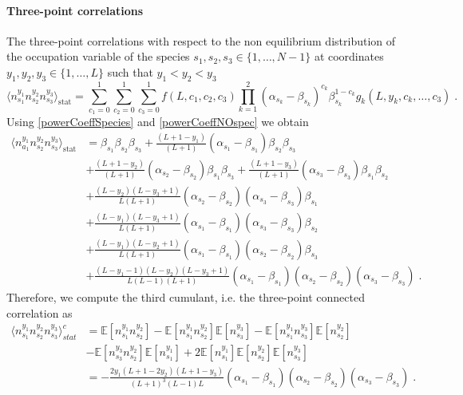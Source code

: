 \documentclass[10pt]{article}
\numberwithin{equation}{section}
\numberwithin{equation}{subsection}
\newcommand{\dt}{\;.}
\begin{document}
\paragraph{Three-point correlations}
The three-point correlations with respect to the non equilibrium distribution of the occupation variable of the species $s_{1},s_{2},s_{3}\in \{1,\ldots,N-1\}$ at coordinates $y_{1},y_{2},y_{3}\in \{1,\ldots,L\}$ such that $y_{1}<y_{2}<y_{3}$
\begin{equation}
	\langle n_{s_{1}}^{y_{1}}n_{s_{2}}^{y_{2}}n_{s_{3}}^{y_{3}}\rangle_{\text{stat}}=\sum_{c_{1}=0}^{1}\sum_{c_{2}=0}^{1}\sum_{c_{3}=0}^{1}f(L,c_{1},c_{2},c_{3})\prod_{k=1}^{2}(\alpha_{s_{k}}-\beta_{s_{k}})^{c_{k}}\beta_{s_{k}}^{1-c_{k}}g_{k}(L,y_{k},c_{k},\ldots,c_{3})\dt
\end{equation}
Using \eqref{powerCoeffSpecies} and \eqref{powerCoeffNOspec} we obtain 
\begin{align}\label{three-pts-corr}
	\langle n_{a_{1}}^{y_{1}}n_{s_{2}}^{y_{2}}n_{s_{3}}^{y_{3}}\rangle_{\text{stat}}&=\beta_{s_{1}}\beta_{s_{2}}\beta_{s_{3}}+\frac{(L+1-y_{1})}{(L+1)}(\alpha_{s_{1}}-\beta_{s_{1}})\beta_{s_{2}}\beta_{s_{3}}
	\\&+\nonumber
	\frac{(L+1-y_{2})}{(L+1)}(\alpha_{s_{2}}-\beta_{s_{2}})\beta_{s_{1}}\beta_{s_{3}}+\frac{(L+1-y_{3})}{(L+1)}(\alpha_{s_{3}}-\beta_{s_{3}})\beta_{s_{1}}\beta_{s_{2}}
	\\&+\nonumber
	\frac{(L-y_{2})(L-y_{3}+1)}{L(L+1)}(\alpha_{s_{2}}-\beta_{s_{2}})(\alpha_{s_{3}}-\beta_{s_{3}})\beta_{s_{1}}
	\\&+\nonumber
	\frac{(L-y_{1})(L-y_{3}+1)}{L(L+1)}(\alpha_{s_{1}}-\beta_{s_{1}})(\alpha_{s_{3}}-\beta_{s_{3}})\beta_{s_{2}}
	\\&+\nonumber
	\frac{(L-y_{1})(L-y_{2}+1)}{L(L+1)}(\alpha_{s_{1}}-\beta_{s_{1}})(\alpha_{s_{2}}-\beta_{s_{2}})\beta_{s_{3}}
	\\&+\nonumber
	\frac{(L-y_{1}-1)(L-y_{2})(L-y_{3}+1)}{L(L-1)(L+1)}(\alpha_{s_{1}}-\beta_{s_{1}})(\alpha_{s_{2}}-\beta_{s_{2}})(\alpha_{s_{3}}-\beta_{s_{3}})\dt
\end{align}
Therefore, we compute the third cumulant, i.e. the three-point connected correlation as 
\begin{align}
	\langle n_{s_{1}}^{y_{1}}n_{s_{2}}^{y_{2}}n_{s_{3}}^{y_{3}}\rangle_{stat}^{c}&=\mathbb{E}\left[n_{s_{1}}^{y_{1}}n_{s_{2}}^{y_{2}}\right]-\mathbb{E}\left[n_{s_{1}}^{y_{1}}n_{s_{2}}^{y_{2}}\right]\mathbb{E}\left[n_{s_{3}}^{y_{3}}\right]-\mathbb{E}\left[n_{s_{1}}^{y_{1}}n_{s_{3}}^{y_{3}}\right]\mathbb{E}\left[n_{s_{2}}^{y_{2}}\right]\nonumber\\&-\mathbb{E}\left[n_{s_{3}}^{y_{3}}n_{s_{2}}^{y_{2}}\right]\mathbb{E}\left[n_{s_{1}}^{y_{1}}\right]+2\mathbb{E}\left[n_{s_{1}}^{y_{1}}\right]\mathbb{E}\left[n_{s_{2}}^{y_{2}}\right]\mathbb{E}\left[n_{s_{3}}^{y_{3}}\right]\nonumber
	\\&=
	-\frac{2y_{1}(L+1-2y_{2})(L+1-y_{3})}{(L+1)^{3}(L-1)L}(\alpha_{s_{1}}-\beta_{s_{1}})(\alpha_{s_{2}}-\beta_{s_{2}})(\alpha_{s_{3}}-\beta_{s_{3}})\dt
\end{align}
\end{document}
